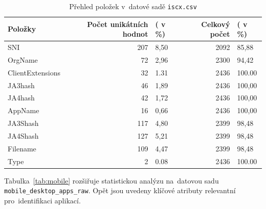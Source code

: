 \begin{table}[H]
	\centering
	\begin{tabular}{lrlrl}
		\toprule
		\textbf{Položky} & \textbf{Počet unikátních hodnot} & \textbf{( v\,\%)} & \textbf{Celkový počet} & \textbf{( v\,\%)} \\
		\midrule
		SNI               & 207                                 & 8{,}50            & 2092                     & 85{,}88           \\
		OrgName           & 72                                  & 2{,}96            & 2300                     & 94{,}42           \\
		ClientExtensions  & 32                                  & 1.31              & 2436                     & 100.00            \\
		JA3hash           & 46                                  & 1{,}89            & 2436                     & 100{,}00          \\
		JA4hash           & 42                                  & 1{,}72            & 2436                     & 100{,}00          \\
		AppName           & 16                                  & 0{,}66            & 2436                     & 100{,}00          \\
		JA3Shash          & 117                                 & 4{,}80            & 2399                     & 98{,}48           \\
		JA4Shash          & 127                                 & 5{,}21            & 2399                     & 98{,}48           \\
		Filename          & 109                                 & 4{,}47            & 2399                     & 98{,}48           \\
		Type              & 2                                   & 0.08              & 2436                     & 100.00            \\
		\bottomrule
	\end{tabular}
	\caption{Přehled položek v~datové sadě \texttt{iscx.csv}}
	\label{tab:iscx}
\end{table}

Tabulka~\ref{tab:mobile} rozšiřuje statistickou analýzu na~datovou sadu \texttt{mobile\_desktop\_apps\_raw}. Opět jsou uvedeny klíčové atributy relevantní pro~identifikaci aplikací.

